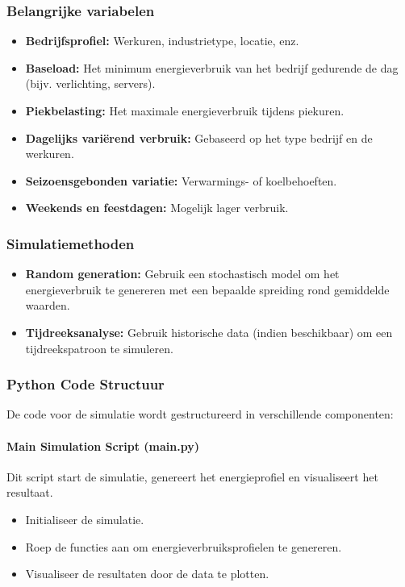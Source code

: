 \documentclass[../main.tex]{subfiles}
\begin{document}
\subsubsection{Belangrijke variabelen}
\begin{itemize}
    \item \textbf{Bedrijfsprofiel:} Werkuren, industrietype, locatie, enz.
    \item \textbf{Baseload:} Het minimum energieverbruik van het bedrijf gedurende de dag (bijv. verlichting, servers).
    \item \textbf{Piekbelasting:} Het maximale energieverbruik tijdens piekuren.
    \item \textbf{Dagelijks variërend verbruik:} Gebaseerd op het type bedrijf en de werkuren.
    \item \textbf{Seizoensgebonden variatie:} Verwarmings- of koelbehoeften.
    \item \textbf{Weekends en feestdagen:} Mogelijk lager verbruik.
\end{itemize}

\subsubsection{Simulatiemethoden}
\begin{itemize}
    \item \textbf{Random generation:} Gebruik een stochastisch model om het energieverbruik te genereren met een bepaalde spreiding rond gemiddelde waarden.
    \item \textbf{Tijdreeksanalyse:} Gebruik historische data (indien beschikbaar) om een tijdreekspatroon te simuleren.
\end{itemize}

\subsubsection{Python Code Structuur}
De code voor de simulatie wordt gestructureerd in verschillende componenten:

\paragraph{Main Simulation Script (main.py)} Dit script start de simulatie, genereert het energieprofiel en visualiseert het resultaat.
\begin{itemize}
    \item Initialiseer de simulatie.
    \item Roep de functies aan om energieverbruiksprofielen te genereren.
    \item Visualiseer de resultaten door de data te plotten.
\end{itemize}
\end{document}
